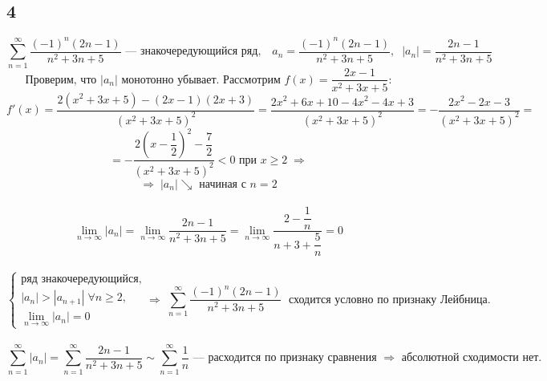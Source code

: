 \documentclass[a4paper,fleqn]{article}
\begin{document}
	\subsection*{4}
	\[ \sum_{n=1}^{\infty} \dfrac{(-1)^n (2n-1)}{n^2 + 3n + 5} \text{ --- знакочередующийся ряд}, \;\;\;
	a_n = \dfrac{(-1)^n (2n-1)}{n^2 + 3n + 5}, \;\; |a_n|  = \dfrac{2n-1}{n^2 + 3n + 5} \]
	\[ \text{Проверим, что $|a_n|$ монотонно убывает. Рассмотрим $f(x) = \dfrac{2x-1}{x^2 + 3x + 5}$:} \]
	\[ f'(x) = \dfrac{2(x^2 + 3x + 5) - (2x-1)(2x+3)}{(x^2 + 3x + 5)^2} = 
	\dfrac{2x^2 + 6x + 10 - 4x^2 - 4x + 3}{(x^2 + 3x + 5)^2} = 
	-\dfrac{2x^2 - 2x - 3}{(x^2 + 3x + 5)^2} = \]
	\[ = -\dfrac{2\left(x - \dfrac12\right)^2 - \dfrac72}{(x^2 + 3x + 5)^2} < 0 \text{ при } x \ge 2  \;\Rightarrow \]
	\[ \Rightarrow \; |a_n| \searrow \text{ начиная с } n = 2 \]\\[-20 pt]
	\[ \lim_{n\to\infty} |a_n| = \lim_{n\to\infty} \dfrac{2n-1}{n^2 + 3n + 5} = \lim_{n\to\infty}\dfrac{2-\dfrac1n}{n + 3 + \dfrac5n} = 0 \]\\[-10 pt]
	\[ \left\{\begin{array}{l} 
	\text{ряд знакочередующийся},\\[5 pt]
	|a_n| > |a_{n+1}| \; \forall n \ge 2,\\[5 pt]
	\lim_{n\to\infty} |a_n| = 0
	\end{array}\right.
	\Rightarrow \; \sum_{n=1}^{\infty} \dfrac{(-1)^n (2n-1)}{n^2 + 3n + 5} \; \text{ сходится условно по признаку Лейбница.} \]\\[-5 pt]
	\[ \sum_{n=1}^{\infty} |a_n| = \sum_{n=1}^{\infty} \dfrac{2n-1}{n^2 + 3n + 5} \sim \sum_{n=1}^{\infty} \dfrac{1}{n} \text{ --- расходится по признаку сравнения } \Rightarrow \text{ абсолютной сходимости нет.} \]\\
	
\end{document}
